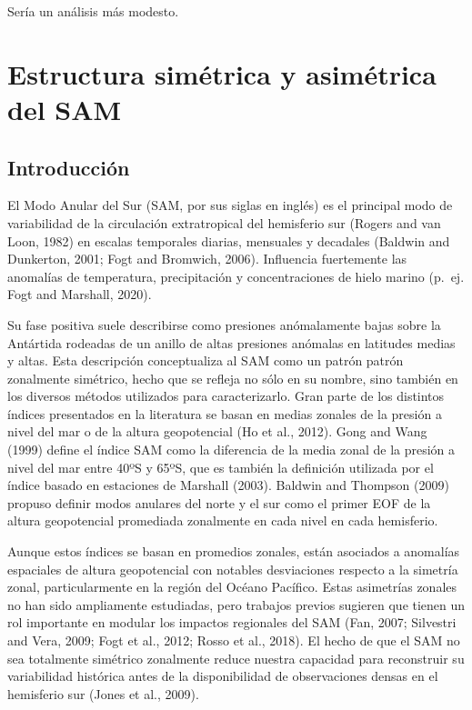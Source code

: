 \documentclass[12pt,oneside]{reedthesis}
\begin{document}
Sería un análisis más modesto.

\hypertarget{estructura-simuxe9trica-y-asimuxe9trica-del-sam}{%
\section{Estructura simétrica y asimétrica del SAM}\label{estructura-simuxe9trica-y-asimuxe9trica-del-sam}}

\hypertarget{introducciuxf3n-1}{%
\subsection{Introducción}\label{introducciuxf3n-1}}

El Modo Anular del Sur (SAM, por sus siglas en inglés) es el principal modo de variabilidad de la circulación extratropical del hemisferio sur (Rogers and van Loon, 1982) en escalas temporales diarias, mensuales y decadales (Baldwin and Dunkerton, 2001; Fogt and Bromwich, 2006).
Influencia fuertemente las anomalías de temperatura, precipitación y concentraciones de hielo marino (p.~ej. Fogt and Marshall, 2020).

Su fase positiva suele describirse como presiones anómalamente bajas sobre la Antártida rodeadas de un anillo de altas presiones anómalas en latitudes medias y altas.
Esta descripción conceptualiza al SAM como un patrón patrón zonalmente simétrico, hecho que se refleja no sólo en su nombre, sino también en los diversos métodos utilizados para caracterizarlo.
Gran parte de los distintos índices presentados en la literatura se basan en medias zonales de la presión a nivel del mar o de la altura geopotencial (Ho et al., 2012).
Gong and Wang (1999) define el índice SAM como la diferencia de la media zonal de la presión a nivel del mar entre 40ºS y 65ºS, que es también la definición utilizada por el índice basado en estaciones de Marshall (2003).
Baldwin and Thompson (2009) propuso definir modos anulares del norte y el sur como el primer EOF de la altura geopotencial promediada zonalmente en cada nivel en cada hemisferio.

Aunque estos índices se basan en promedios zonales, están asociados a anomalías espaciales de altura geopotencial con notables desviaciones respecto a la simetría zonal, particularmente en la región del Océano Pacífico.
Estas asimetrías zonales no han sido ampliamente estudiadas, pero trabajos previos sugieren que tienen un rol importante en modular los impactos regionales del SAM (Fan, 2007; Silvestri and Vera, 2009; Fogt et al., 2012; Rosso et al., 2018).
El hecho de que el SAM no sea totalmente simétrico zonalmente reduce nuestra capacidad para reconstruir su variabilidad histórica antes de la disponibilidad de observaciones densas en el hemisferio sur (Jones et al., 2009).
\end{document}
